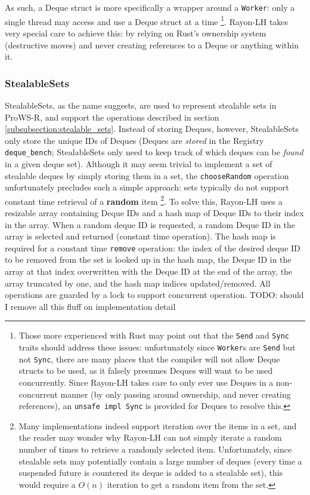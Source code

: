 \documentclass[bsc,frontabs,singlespacing,parskip,deptreport,normalheadings]{infthesis}
\begin{document}
As such, a Deque struct is more specifically a wrapper around a \texttt{Worker}:
only a single thread may access and use a Deque struct at a time \footnote{Those
    more experienced with Rust may point out that the \texttt{Send} and
    \texttt{Sync} traits should address these issues: unfortunately since
    \texttt{Worker}s are \texttt{Send} but not \texttt{Sync}, there are many
    places that the compiler will not allow Deque structs to be used, as it
    falsely presumes Deques will want to be used concurrently. Since Rayon-LH
takes care to only ever use Deques in a non-concurrent manner (by only passing
around ownership, and never creating references), an \texttt{unsafe impl Sync}
is provided for Deques to resolve this.}. Rayon-LH takes very special care to
achieve this: by relying on Rust's ownership system (destructive moves) and
never creating references to a Deque or anything within it.

\subsubsection*{StealableSets}

StealableSets, as the name suggests, are used to represent stealable sets in
ProWS-R, and support the operations described in section
\ref{subsubsection:stealable_sets}. Instead of storing Deques, however,
StealableSets only store the unique IDs of Deques (Deques are \textit{stored} in
the Registry \texttt{deque\_bench}; StealableSets only need to keep track of
which deques can be \textit{found} in a given deque set). Although it may seem
trivial to implement a set of stealable deques by simply storing them in a set,
the \texttt{chooseRandom} operation unfortunately precludes such a simple
approach: sets typically do not support constant time retrieval of a
\textbf{random} item \footnote{Many implementations indeed support iteration
    over the items in a set, and the reader may wonder why Rayon-LH can not
    simply iterate a random number of times to retrieve a randomly selected
    item. Unfortunately, since stealable sets may potentially contain a large
    number of deques (every time a suspended future is countered its deque is
    added to a stealable set), this would require a \(O(n)\) iteration to get a
random item from the set.}. To solve this, Rayon-LH uses a resizable array
containing Deque IDs and a hash map of Deque IDs to their index in the
array. When a random deque ID is requested, a random Deque ID in the array
is selected and returned (constant time operation). The hash map is required for
a constant time \texttt{remove} operation: the index of the desired deque ID to
be removed from the set is looked up in the hash map, the Deque ID in the array
at that index overwritten with the Deque ID at the end of the array, the array
truncated by one, and the hash map indices updated/removed. All operations are
guarded by a lock to support concurrent operation. TODO: should I remove all
this fluff on implementation detail
\end{document}
